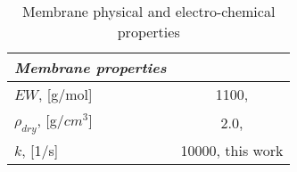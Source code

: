 \documentclass[]{elsart}
\begin{document}
 \begin{table}[ptb]\begin{center}
 \caption{Membrane physical and electro-chemical properties}
 \label{tb:data_membrane}
 \begin{tabular}{lc}  \hline \hline
	\it{Membrane properties}  \\ \hline
	$EW$, [g/mol]                                         & 1100, \cite{Springer91}       		\\
	$\rho_{dry}$, [g/$cm^3$]                        & 2.0, \cite{Springer91}  \\
	$k$, [1/s]                                                 & 10000, this work\\
	\hline \hline
\end{tabular} \end{center} \end{table}
\end{document}
